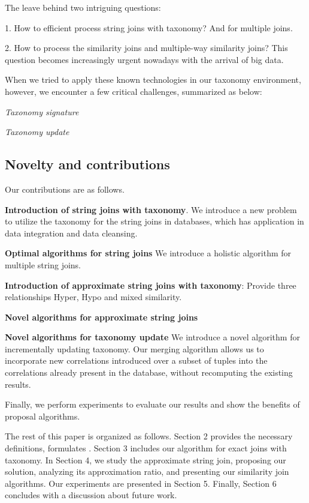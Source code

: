 The leave behind two intriguing questions:

1. How to efficient process string joins with taxonomy? And for multiple joins.


2. How to process the similarity joins and multiple-way similarity joins?  This question becomes increasingly urgent nowadays with the arrival of big data.

When we tried to apply these known technologies in our taxonomy environment, however, we encounter a few critical challenges, summarized as below:

\noindent \textit{Taxonomy signature}

\noindent \textit{Taxonomy update}





\subsection{Novelty and contributions}


\smallskip


Our contributions are as follows.

\noindent \textbf{Introduction of string joins with taxonomy}. We introduce a new problem to utilize the taxonomy for the string joins in databases, which has application in data integration and data cleansing.

\noindent \textbf{Optimal algorithms for string joins} We introduce a holistic algorithm for multiple string joins.

\noindent \textbf{Introduction of approximate string joins with taxonomy}: Provide three relationships Hyper, Hypo and mixed similarity.

\noindent \textbf{Novel algorithms for approximate string joins}

\noindent \textbf{Novel algorithms for taxonomy update}  We introduce a novel algorithm for incrementally updating taxonomy. Our merging algorithm allows us to incorporate new correlations introduced over a subset of tuples into
the correlations already present in the database, without recomputing the existing results.


Finally, we perform experiments to evaluate our results and show the benefits of proposal algorithms.


\smallskip

The rest of this paper is organized as follows. Section 2
provides the necessary definitions, formulates . Section
3 includes our algorithm for exact joins with taxonomy. In Section 4, we study
the approximate string join, proposing our solution, analyzing its approximation
ratio, and presenting our similarity join algorithms.
Our experiments are presented in Section 5. Finally,
Section 6 concludes with a discussion about future work.
